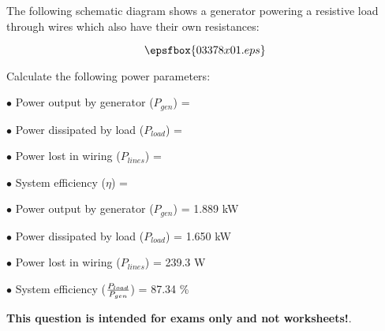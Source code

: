 

The following schematic diagram shows a generator powering a resistive load through wires which also have their own resistances:

$$\epsfbox{03378x01.eps}$$

Calculate the following power parameters:

\medskip
\item{$\bullet$} Power output by generator ($P_{gen}$) = 
\vskip 5pt
\item{$\bullet$} Power dissipated by load ($P_{load}$) =
\vskip 5pt
\item{$\bullet$} Power lost in wiring ($P_{lines}$) = 
\vskip 5pt
\item{$\bullet$} System efficiency ($\eta$) = 
\medskip







\medskip
\item{$\bullet$} Power output by generator ($P_{gen}$) = 1.889 kW
\item{$\bullet$} Power dissipated by load ($P_{load}$) = 1.650 kW
\item{$\bullet$} Power lost in wiring ($P_{lines}$) = 239.3 W
\item{$\bullet$} System efficiency ($P_{load} \over P_{gen}$) = 87.34 \%
\medskip







{\bf This question is intended for exams only and not worksheets!}.




